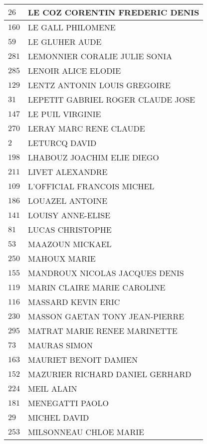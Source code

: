 \begin{xltabular}{\linewidth}{|l|X|}
    \hline
    $26$ & LE COZ CORENTIN FREDERIC DENIS \\
    \hline
    $160$ & LE GALL PHILOMENE \\
    \hline
    $59$ & LE GLUHER AUDE \\
    \hline
    $281$ & LEMONNIER CORALIE JULIE SONIA \\
    \hline
    $285$ & LENOIR ALICE ELODIE \\
    \hline
    $129$ & LENTZ ANTONIN LOUIS GREGOIRE \\
    \hline
    $31$ & LEPETIT GABRIEL ROGER CLAUDE JOSE \\
    \hline
    $147$ & LE PUIL VIRGINIE \\
    \hline
    $270$ & LERAY MARC RENE CLAUDE \\
    \hline
    $2$ & LETURCQ DAVID \\
    \hline
    $198$ & LHABOUZ JOACHIM ELIE DIEGO \\
    \hline
    $211$ & LIVET ALEXANDRE \\
    \hline
    $109$ & L'OFFICIAL FRANCOIS MICHEL \\
    \hline
    $186$ & LOUAZEL ANTOINE \\
    \hline
    $141$ & LOUISY ANNE-ELISE \\
    \hline
    $81$ & LUCAS CHRISTOPHE \\
    \hline
    $53$ & MAAZOUN MICKAEL \\
    \hline
    $250$ & MAHOUX MARIE \\
    \hline
    $155$ & MANDROUX NICOLAS JACQUES DENIS \\
    \hline
    $119$ & MARIN CLAIRE MARIE CAROLINE \\
    \hline
    $116$ & MASSARD KEVIN ERIC \\
    \hline
    $230$ & MASSON GAETAN TONY JEAN-PIERRE \\
    \hline
    $295$ & MATRAT MARIE RENEE MARINETTE \\
    \hline
    $73$ & MAURAS SIMON \\
    \hline
    $163$ & MAURIET BENOIT DAMIEN \\
    \hline
    $152$ & MAZURIER RICHARD DANIEL GERHARD \\
    \hline
    $224$ & MEIL ALAIN \\
    \hline
    $181$ & MENEGATTI PAOLO \\
    \hline
    $29$ & MICHEL DAVID \\
    \hline
    $253$ & MILSONNEAU CHLOE MARIE \\

\end{xltabular}
